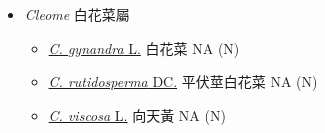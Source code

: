 
  \begin{itemize}
 \item[] \textit{Cleome} 白花菜屬
                                
  \begin{itemize}
        \item[] \href{http://www.theplantlist.org/tpl1.1/search?q=Cleome+gynandra}{\textit{C. gynandra} L.}   白花菜   NA (N)
        \item[] \href{http://www.theplantlist.org/tpl1.1/search?q=Cleome+rutidosperma}{\textit{C. rutidosperma} DC.}   平伏莖白花菜   NA (N)
        \item[] \href{http://www.theplantlist.org/tpl1.1/search?q=Cleome+viscosa}{\textit{C. viscosa} L.}   向天黃   NA (N)
  \end{itemize}
  \end{itemize}
